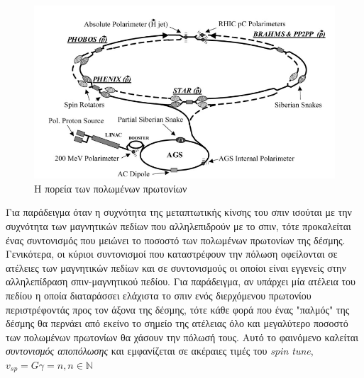 	
	\begin{figure}[h!]
		\centering
		\includegraphics[scale=0.7]{Accelerating_System/protons_path}
		\caption{Η πορεία των πολωμένων πρωτονίων}
		\label{fig2.9}
	\end{figure}
	
	 Για παράδειγμα όταν η συχνότητα της μεταπτωτικής κίνσης του σπιν ισούται με την συχνότητα των μαγνητικών πεδίων που αλληλεπιδρούν με το σπιν, τότε προκαλείται ένας συντονισμός που μειώνει το ποσοστό των πολωμένων πρωτονίων της δέσμης.
 	Γενικότερα, οι κύριοι συντονισμοί που καταστρέφουν την πόλωση οφείλονται σε ατέλειες των μαγνητικών πεδίων και σε συντονισμούς οι οποίοι είναι εγγενείς στην αλληλεπίδραση σπιν-μαγνητικού πεδίου.
	Για παράδειγμα, αν υπάρχει μία ατέλεια του πεδίου η οποία διαταράσσει ελάχιστα το σπιν ενός διερχόμενου πρωτονίου περιστρέφοντάς προς τον άξονα της δέσμης, τότε κάθε φορά που ένας "παλμός" της δέσμης θα περνάει από εκείνο το σημείο της ατέλειας όλο και μεγαλύτερο ποσοστό των πολωμένων πρωτονίων θα χάσουν την πόλωσή τους. Αυτό το φαινόμενο καλείται \textit{συντονισμός αποπόλωσης} και εμφανίζεται σε ακέραιες τιμές του \textit{spin tune}, $v_{sp} = G\gamma =n, n\in\mathbb{N}$ 
 	
 
 
%	
%	

